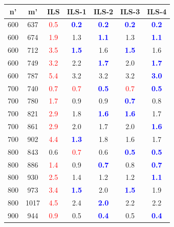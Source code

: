 \begin{tabular}{|cc|c|cccc|}
\hline
\rowcolor{gray!30} \textbf{n'} &  \textbf{m'} &  \textbf{ILS} &  \textbf{ILS-1} &  \textbf{ILS-2} &  \textbf{ILS-3} &  \textbf{ILS-4}\\ \hline
600 & 637 & \textcolor{red}{0.5} & \textbf{\textcolor{blue}{0.2}} & \textbf{\textcolor{blue}{0.2}} & \textbf{\textcolor{blue}{0.2}} & \textbf{\textcolor{blue}{0.2}}\\
600 & 674 & \textcolor{red}{1.9} & 1.3 & \textbf{\textcolor{blue}{1.1}} & 1.3 & \textbf{\textcolor{blue}{1.1}}\\
600 & 712 & \textcolor{red}{3.5} & \textbf{\textcolor{blue}{1.5}} & 1.6 & \textbf{\textcolor{blue}{1.5}} & 1.6\\
600 & 749 & \textcolor{red}{3.2} & 2.2 & \textbf{\textcolor{blue}{1.7}} & 2.0 & \textbf{\textcolor{blue}{1.7}}\\
600 & 787 & \textcolor{red}{5.4} & 3.2 & 3.2 & 3.2 & \textbf{\textcolor{blue}{3.0}}\\
700 & 740 & \textcolor{red}{0.7} & \textcolor{red}{0.7} & \textbf{\textcolor{blue}{0.5}} & \textcolor{red}{0.7} & \textbf{\textcolor{blue}{0.5}}\\
700 & 780 & \textcolor{red}{1.7} & 0.9 & 0.9 & \textbf{\textcolor{blue}{0.7}} & 0.8\\
700 & 821 & \textcolor{red}{2.9} & 1.8 & \textbf{\textcolor{blue}{1.6}} & \textbf{\textcolor{blue}{1.6}} & 1.7\\
700 & 861 & \textcolor{red}{2.9} & 2.0 & 1.7 & 2.0 & \textbf{\textcolor{blue}{1.6}}\\
700 & 902 & \textcolor{red}{4.4} & \textbf{\textcolor{blue}{1.3}} & 1.8 & 1.6 & 1.7\\
800 & 843 & 0.6 & \textcolor{red}{0.7} & 0.6 & \textbf{\textcolor{blue}{0.5}} & \textbf{\textcolor{blue}{0.5}}\\
800 & 886 & \textcolor{red}{1.4} & 0.9 & \textbf{\textcolor{blue}{0.7}} & 0.8 & \textbf{\textcolor{blue}{0.7}}\\
800 & 930 & \textcolor{red}{2.5} & 1.4 & 1.2 & 1.2 & \textbf{\textcolor{blue}{1.1}}\\
800 & 973 & \textcolor{red}{3.4} & \textbf{\textcolor{blue}{1.5}} & 2.0 & \textbf{\textcolor{blue}{1.5}} & 1.9\\
800 & 1017 & \textcolor{red}{4.5} & 2.4 & \textbf{\textcolor{blue}{2.0}} & 2.2 & 2.2\\
900 & 944 & \textcolor{red}{0.9} & 0.5 & \textbf{\textcolor{blue}{0.4}} & 0.5 & \textbf{\textcolor{blue}{0.4}}\\

\end{tabular}

